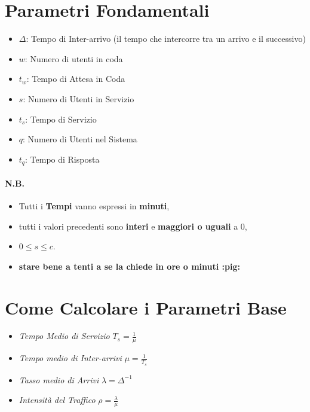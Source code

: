 \section{Parametri Fondamentali}

\begin{itemize}
    \item $\Delta$: Tempo di Inter-arrivo (il tempo che intercorre tra un arrivo
          e il successivo)
    \item $w$: Numero di utenti in coda
    \item $t_w$: Tempo di Attesa in Coda
    \item $s$: Numero di Utenti in Servizio
    \item $t_s$: Tempo di Servizio
    \item $q$: Numero di Utenti nel Sistema
    \item $t_q$: Tempo di Risposta
\end{itemize}

\paragraph{N.B.}
\begin{itemize}
    \item Tutti i \textbf{Tempi} vanno espressi in \textbf{minuti},
    \item tutti i valori precedenti sono \textbf{interi} e \textbf{maggiori o
              uguali} a 0,
    \item $0 \leq s \leq c$.
    \item \textbf{stare bene a tenti a se la chiede in ore o minuti :pig:}
\end{itemize}

\section{Come Calcolare i Parametri Base} \label{parametri-base}

\begin{itemize}
    \item \textit{Tempo Medio di Servizio} $T_s = \frac{1}{\mu}$
    \item \textit{Tempo medio di Inter-arrivi} $\mu = \frac{1}{T_s}$
    \item \textit{Tasso medio di Arrivi} $\lambda = \Delta^{-1}$
    \item \textit{Intensità del Traffico} $\rho = \frac{\lambda}{\mu}$
\end{itemize}

